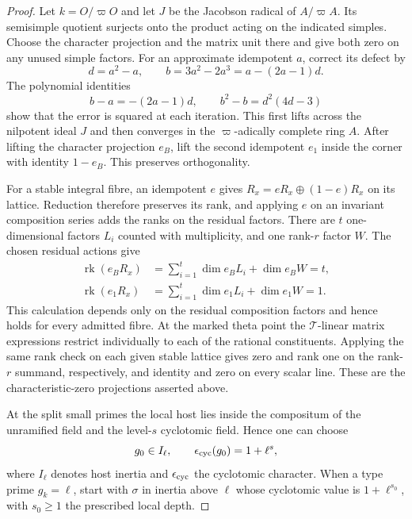 \begin{proof}
Let \(k=O/\varpi O\) and let \(J\) be the Jacobson radical
of \(A/\varpi A\). Its semisimple quotient surjects onto
the product acting on the indicated simples. Choose the
character projection and the matrix unit there and give
both zero on any unused simple factors. For an approximate idempotent \(a\), correct its defect by
\[
 d=a^2-a,\qquad b=3a^2-2a^3=a-(2a-1)d.
\]
The polynomial identities
\[
       b-a=-(2a-1)d,\qquad
       b^2-b=d^2(4d-3)
\]
show that the error is squared at each iteration.
This first lifts across the nilpotent ideal \(J\) and then
converges in the \(\varpi\)-adically complete ring \(A\).
After lifting the character projection \(e_B\), lift the
second idempotent \(e_1\) inside the corner with identity
\(1-e_B\). This preserves orthogonality.

For a stable integral fibre, an idempotent \(e\) gives
\(R_x=eR_x\oplus(1-e)R_x\) on its lattice. Reduction
therefore preserves its rank, and applying \(e\) on an
invariant composition series adds the ranks on the
residual factors. There are \(t\) one-dimensional factors \(L_i\)
counted with multiplicity, and one rank-\(r\) factor \(W\).
The chosen residual actions give
\[
 \begin{aligned}
 \operatorname{rk}(e_B R_x)&=\sum_{i=1}^{t}\dim e_B L_i
                                      +\dim e_B W=t,\\
 \operatorname{rk}(e_1 R_x)&=\sum_{i=1}^{t}\dim e_1 L_i
                                      +\dim e_1 W=1 .
 \end{aligned}
\]
This calculation depends only on the residual composition
factors and hence holds for every admitted fibre. At the marked theta point the \(\mathcal T\)-linear
matrix expressions restrict individually to each of the
rational constituents. Applying the same rank check on
each given stable lattice gives zero and rank one on the
rank-\(r\) summand, respectively, and identity and zero
on every scalar line. These are the characteristic-zero
projections asserted above.

At the split small primes the local host lies inside the compositum of the unramified field and the level-\(s\) cyclotomic field. Hence one can choose
\[
 g_0\in I_\ell,\qquad \epsilon_{\rm cyc}(g_0)=1+\ell^s,
\]
where \(I_\ell\) denotes host inertia and \(\epsilon_{\rm cyc}\) the cyclotomic character. When a type prime \(g_k=\ell\), start with
\(\sigma\) in inertia above \(\ell\) whose cyclotomic value
is \(1+\ell^{s_0}\), with \(s_0\ge1\) the prescribed local
depth.


\end{proof}
